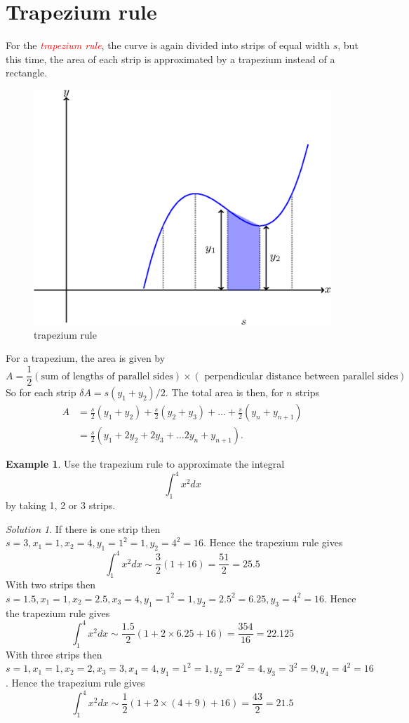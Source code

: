 \documentclass[
  11pt,
  oneside]{book}
\newcommand{\slide}{}
\theoremstyle{definition}
\theoremstyle{definition}
\newtheorem{example}{Example}[chapter]
\theoremstyle{definition}
\theoremstyle{definition}
\theoremstyle{remark}
\newtheorem*{solution}{Solution}
\begin{document}
\slide

\section{Trapezium rule}\label{trapezium-rule}

For the \textcolor{red}{\em trapezium rule}, the curve is again divided into strips of equal width \(s\), but this time, the area of each strip is approximated by a trapezium instead of a rectangle.

\begin{figure}

{\centering \includegraphics[width=0.4\linewidth]{tikztopng-figure28} 

}

\caption{trapezium rule}\label{fig:unnamed-chunk-53}
\end{figure}

For a trapezium, the area is given by
\[
A =\frac12(\text{sum of lengths of parallel sides}) \times(\text{ perpendicular distance between parallel sides})
\]
So for each strip \(\delta A =s(y_1+y_2)/2\). The total area is then, for \(n\) strips
\begin{align*}
A& = \frac s2(y_1+y_2) + \frac s2(y_2+y_3) + \ldots + \frac s2(y_{n}+y_{n+1})\\
&= \frac s2\left(y_1+2y_2+2y_3+\ldots 2y_{n}+y_{n+1}\right).
\end{align*}

\slide

\begin{example}
Use the trapezium rule to approximate the integral
\[
\int_1^4x^2dx
\]
by taking 1, 2 or 3 strips.
\end{example}

\begin{solution}
If there is one strip then \(s=3, x_1=1, x_2 = 4, y_1=1^2=1, y_2=4^2=16\). Hence the trapezium rule gives
\[
\int_1^4 x^2 dx \sim \frac32\left(1+16\right) = \frac{51}{2} = 25.5
\]
With two strips then \(s=1.5,x_1=1, x_2=2.5, x_3=4, y_1=1^2=1, y_2=2.5^2=6.25, y_3=4^2=16\). Hence the trapezium rule gives
\[
\int_1^4 x^2 dx \sim \frac{1.5}2\left(1+2\times6.25+16\right) = \frac{354}{16} = 22.125
\]
With three strips then \(s=1,x_1=1, x_2=2, x_3 = 3, x_4=4, y_1=1^2=1, y_2=2^2=4, y_3=3^2=9, y_4=4^2=16\). Hence the trapezium rule gives
\[
\int_1^4 x^2 dx \sim \frac{1}2\left(1+2\times(4+9)+16\right) = \frac{43}{2} = 21.5
\]
\end{solution}
\end{document}
